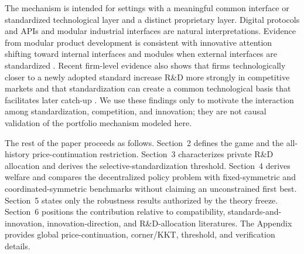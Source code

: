 The mechanism is intended for settings with a meaningful common interface or standardized technological layer and a distinct proprietary layer. Digital protocols and APIs and modular industrial interfaces are natural interpretations. Evidence from modular product development is consistent with innovative attention shifting toward internal interfaces and modules when external interfaces are standardized \citep{ChenLiu2005}. Recent firm-level evidence also shows that firms technologically closer to a newly adopted standard increase R\&D more strongly in competitive markets and that standardization can create a common technological basis that facilitates later catch-up \citep{BergeaudSchmidtZago2026}. We use these findings only to motivate the interaction among standardization, competition, and innovation; they are not causal validation of the portfolio mechanism modeled here.

The rest of the paper proceeds as follows. Section~2 defines the game and the all-history price-continuation restriction. Section~3 characterizes private R\&D allocation and derives the selective-standardization threshold. Section~4 derives welfare and compares the decentralized policy problem with fixed-symmetric and coordinated-symmetric benchmarks without claiming an unconstrained first best. Section~5 states only the robustness results authorized by the theory freeze. Section~6 positions the contribution relative to compatibility, standards-and-innovation, innovation-direction, and R\&D-allocation literatures. The Appendix provides global price-continuation, corner/KKT, threshold, and verification details.
